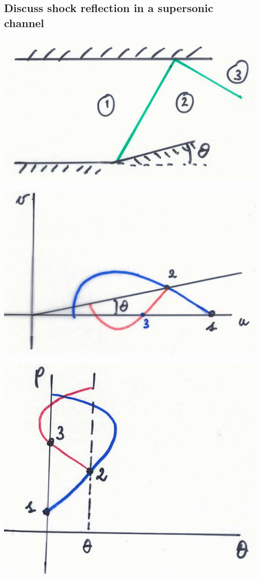 \documentclass[british,french,11pt, a4paper, openany]{article}
\begin{document}
\subsection{Discuss shock reflection in a supersonic channel}
\begin{center}
	\begin{minipage}{0.33\textwidth}
		\includegraphics[scale=0.15]{ch9/5}
	\end{minipage}
	\begin{minipage}{0.35\textwidth}
		\includegraphics[scale=0.12]{ch9/6}
	\end{minipage}
	\begin{minipage}{0.25\textwidth}
		\includegraphics[scale=0.11]{ch9/7}

\end{minipage}
\end{center}
\end{document}
